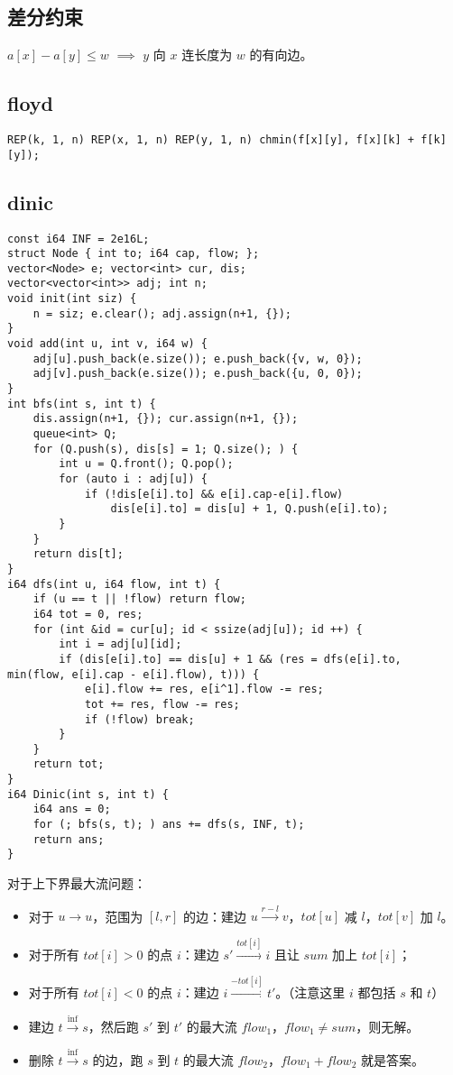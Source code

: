 \documentclass[a4paper,landscape,twocolumn]{ctexart}
\begin{document}
\subsection{差分约束}

$ a[x] - a[y] \leq w$ $\implies$ $y$ 向 $x$ 连长度为 $w$ 的有向边。

\subsection{floyd}

\begin{lstlisting}
REP(k, 1, n) REP(x, 1, n) REP(y, 1, n) chmin(f[x][y], f[x][k] + f[k][y]);
\end{lstlisting}

\subsection{dinic}

\begin{lstlisting}
const i64 INF = 2e16L;
struct Node { int to; i64 cap, flow; };
vector<Node> e; vector<int> cur, dis;
vector<vector<int>> adj; int n;
void init(int siz) {
	n = siz; e.clear(); adj.assign(n+1, {});
}
void add(int u, int v, i64 w) {
	adj[u].push_back(e.size()); e.push_back({v, w, 0});
	adj[v].push_back(e.size()); e.push_back({u, 0, 0});
}
int bfs(int s, int t) {
	dis.assign(n+1, {}); cur.assign(n+1, {});
	queue<int> Q;
	for (Q.push(s), dis[s] = 1; Q.size(); ) {
		int u = Q.front(); Q.pop();
		for (auto i : adj[u]) {
			if (!dis[e[i].to] && e[i].cap-e[i].flow)
				dis[e[i].to] = dis[u] + 1, Q.push(e[i].to);
		}
	}
	return dis[t];
}
i64 dfs(int u, i64 flow, int t) {
	if (u == t || !flow) return flow;
	i64 tot = 0, res;
	for (int &id = cur[u]; id < ssize(adj[u]); id ++) {
		int i = adj[u][id];
		if (dis[e[i].to] == dis[u] + 1 && (res = dfs(e[i].to, min(flow, e[i].cap - e[i].flow), t))) {
			e[i].flow += res, e[i^1].flow -= res;
			tot += res, flow -= res;
			if (!flow) break;
		}
	}
	return tot;
}
i64 Dinic(int s, int t) {
	i64 ans = 0;
	for (; bfs(s, t); ) ans += dfs(s, INF, t);
	return ans;
}
\end{lstlisting}

对于上下界最大流问题：

\begin{itemize}
\item 对于 $u \to u$，范围为 $[l, r]$ 的边：建边 $u \xrightarrow{r - l} v$，$tot[u]$ 减 $l$，$tot[v]$ 加 $l$。
\item 对于所有 $tot[i] > 0$ 的点 $i$：建边 $s' \xrightarrow{tot[i]} i$ 且让 $sum$ 加上 $tot[i]$；
\item 对于所有 $tot[i] < 0$ 的点 $i$：建边 $i \xrightarrow{-tot[i]} t'$。（注意这里 $i$ 都包括 $s$ 和 $t$）
\item 建边 $t \xrightarrow{\inf} s$，然后跑 $s'$ 到 $t'$ 的最大流 $flow_1$，$flow_1 \neq sum$，则无解。
\item 删除 $t \xrightarrow{\inf} s$ 的边，跑 $s$ 到 $t$ 的最大流 $flow_2$，$flow_1 + flow_2$ 就是答案。
\end{itemize}
\end{document}
